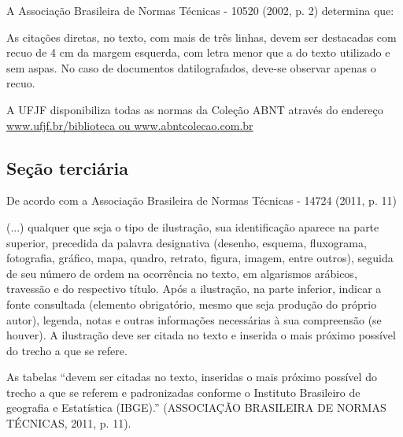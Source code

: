 \documentclass[
        12pt,
        openany, %
        oneside, %
        a4paper,			
        english,			
        brazil			        %
        ]{abntbibufjf}
\begin{document}
A Associa\c{c}\~ao Brasileira de Normas T\'ecnicas - 10520 (2002, p. 2) determina que:
\begin{citacao}
As cita\c{c}\~oes diretas, no texto, com mais de tr\^es linhas, devem ser destacadas 
com recuo de 4 cm da margem esquerda, com letra menor que a do texto utilizado 
e sem aspas. No caso de documentos datilografados, deve-se observar apenas o recuo. 
\end{citacao}

A UFJF disponibiliza todas as normas da Cole\c{c}\~ao ABNT atrav\'es do endere\c{c}o
\url{www.ufjf.br/biblioteca ou www.abntcolecao.com.br} 

\subsection{\textbf{Se\c{c}\~ao terci\'aria}} %

De acordo com a Associa\c{c}\~ao Brasileira de Normas T\'ecnicas - 14724 (2011, p. 11)
\begin{citacao}
 (...) qualquer que seja o tipo de ilustra\c{c}\~ao, sua identifica\c{c}\~ao aparece na parte superior, 
 precedida da palavra designativa (desenho, esquema, fluxograma, fotografia, gr\'afico, mapa, 
 quadro, retrato, figura, imagem, entre outros), seguida de seu n\'umero de ordem na ocorr\^encia 
 no texto, em algarismos ar\'abicos, travess\~ao e do respectivo t\'itulo. Ap\'os a ilustra\c{c}\~ao, 
 na parte inferior, indicar a fonte consultada (elemento obrigat\'orio, mesmo que seja produ\c{c}\~ao 
 do pr\'oprio autor), legenda, notas e outras informa\c{c}\~oes necess\'arias \`a sua compreens\~ao (se houver). 
 A ilustra\c{c}\~ao deve ser citada no texto e inserida o mais pr\'oximo poss\'ivel do trecho a que se refere. 
\end{citacao}

As tabelas ``devem ser citadas no texto, inseridas o mais pr\'oximo poss\'ivel do trecho a que se 
referem e padronizadas conforme o Instituto Brasileiro de geografia e Estat\'istica (IBGE).''
(ASSOCIA\c{C}\~AO BRASILEIRA DE NORMAS T\'ECNICAS, 2011, p. 11).


\end{document}
